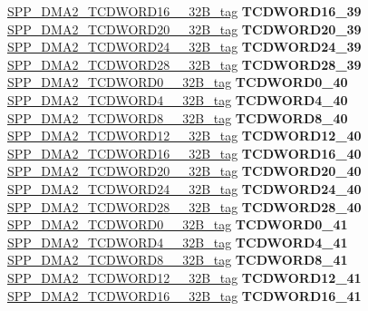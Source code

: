 \begin{DoxyCompactItemize}
\begin{tabbing}
\>\>\mbox{\hyperlink{unionSPP__DMA2__TCDWORD16____32B__tag}{SPP\_DMA2\_TCDWORD16\_\_32B\_tag}} {\bfseries TCDWORD16\_39}\\
\>\>\mbox{\hyperlink{unionSPP__DMA2__TCDWORD20____32B__tag}{SPP\_DMA2\_TCDWORD20\_\_32B\_tag}} {\bfseries TCDWORD20\_39}\\
\>\>\mbox{\hyperlink{unionSPP__DMA2__TCDWORD24____32B__tag}{SPP\_DMA2\_TCDWORD24\_\_32B\_tag}} {\bfseries TCDWORD24\_39}\\
\>\>\mbox{\hyperlink{unionSPP__DMA2__TCDWORD28____32B__tag}{SPP\_DMA2\_TCDWORD28\_\_32B\_tag}} {\bfseries TCDWORD28\_39}\\
\>\>\mbox{\hyperlink{unionSPP__DMA2__TCDWORD0____32B__tag}{SPP\_DMA2\_TCDWORD0\_\_32B\_tag}} {\bfseries TCDWORD0\_40}\\
\>\>\mbox{\hyperlink{unionSPP__DMA2__TCDWORD4____32B__tag}{SPP\_DMA2\_TCDWORD4\_\_32B\_tag}} {\bfseries TCDWORD4\_40}\\
\>\>\mbox{\hyperlink{unionSPP__DMA2__TCDWORD8____32B__tag}{SPP\_DMA2\_TCDWORD8\_\_32B\_tag}} {\bfseries TCDWORD8\_40}\\
\>\>\mbox{\hyperlink{unionSPP__DMA2__TCDWORD12____32B__tag}{SPP\_DMA2\_TCDWORD12\_\_32B\_tag}} {\bfseries TCDWORD12\_40}\\
\>\>\mbox{\hyperlink{unionSPP__DMA2__TCDWORD16____32B__tag}{SPP\_DMA2\_TCDWORD16\_\_32B\_tag}} {\bfseries TCDWORD16\_40}\\
\>\>\mbox{\hyperlink{unionSPP__DMA2__TCDWORD20____32B__tag}{SPP\_DMA2\_TCDWORD20\_\_32B\_tag}} {\bfseries TCDWORD20\_40}\\
\>\>\mbox{\hyperlink{unionSPP__DMA2__TCDWORD24____32B__tag}{SPP\_DMA2\_TCDWORD24\_\_32B\_tag}} {\bfseries TCDWORD24\_40}\\
\>\>\mbox{\hyperlink{unionSPP__DMA2__TCDWORD28____32B__tag}{SPP\_DMA2\_TCDWORD28\_\_32B\_tag}} {\bfseries TCDWORD28\_40}\\
\>\>\mbox{\hyperlink{unionSPP__DMA2__TCDWORD0____32B__tag}{SPP\_DMA2\_TCDWORD0\_\_32B\_tag}} {\bfseries TCDWORD0\_41}\\
\>\>\mbox{\hyperlink{unionSPP__DMA2__TCDWORD4____32B__tag}{SPP\_DMA2\_TCDWORD4\_\_32B\_tag}} {\bfseries TCDWORD4\_41}\\
\>\>\mbox{\hyperlink{unionSPP__DMA2__TCDWORD8____32B__tag}{SPP\_DMA2\_TCDWORD8\_\_32B\_tag}} {\bfseries TCDWORD8\_41}\\
\>\>\mbox{\hyperlink{unionSPP__DMA2__TCDWORD12____32B__tag}{SPP\_DMA2\_TCDWORD12\_\_32B\_tag}} {\bfseries TCDWORD12\_41}\\
\>\>\mbox{\hyperlink{unionSPP__DMA2__TCDWORD16____32B__tag}{SPP\_DMA2\_TCDWORD16\_\_32B\_tag}} {\bfseries TCDWORD16\_41}\\

\end{tabbing}
\end{DoxyCompactItemize}
